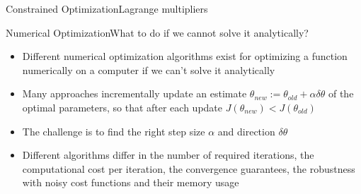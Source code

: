 \begin{frame}{Constrained Optimization}{Lagrange multipliers}
\end{frame}

\begin{frame}{Numerical Optimization}{What to do if we cannot solve it analytically?}
	\begin{itemize}
		\item Different numerical optimization algorithms exist for optimizing a function numerically on a computer if we can't solve it analytically
		\item Many approaches incrementally update an estimate $\theta_{new} := \theta_{old} + \alpha \delta\theta$ of the optimal parameters, so that after each update $J(\theta_{new}) < J(\theta_{old})$
		\item The challenge is to find the right step size $\alpha$ and direction $\delta\theta$
		\item Different algorithms differ in the number of required iterations, the computational cost per iteration, the convergence guarantees, the robustness with noisy cost functions and their memory usage
	\end{itemize}
\end{frame}

